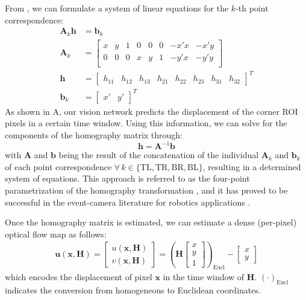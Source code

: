 From , we can formulate a system of linear equations for the $k$-th point correspondence:
\begin{align}
    \boldsymbol{A}_k \boldsymbol{h} &= \boldsymbol{b}_k \\
    \boldsymbol{A}_k &=  
    \begin{bmatrix}
    x & y & 1 & 0 & 0 & 0 & -x'x & -x'y \\
    0 & 0 & 0 & x & y & 1 & -y'x & -y'y\\
    \end{bmatrix}\label{eq:4}\\
    \boldsymbol{h} &= 
    \begin{bmatrix}
    h_{11} & h_{12} & h_{13} & h_{21} & h_{22} & h_{23} & h_{31} & h_{32}
    \end{bmatrix}^T\\
    \boldsymbol{b}_k &=
    \begin{bmatrix}
    x' & y'
    \end{bmatrix}^T\label{eq:6}
\end{align}
As shown in A, our vision network predicts the displacement of the corner ROI pixels in a certain time window. Using this information, we can solve for the components of the homography matrix through:
\begin{equation}
    \boldsymbol{h}=\boldsymbol{A}^{-1}\boldsymbol{b}
\end{equation}
with $\boldsymbol{A}$ and $\boldsymbol{b}$ being the result of the concatenation of the individual $\boldsymbol{A}_k$ and $\boldsymbol{b}_k$ of each point correspondence $\forall\, k\in\{\mathrm{TL},\mathrm{TR},\mathrm{BR},\mathrm{BL}\}$, resulting in a determined system of equations. This approach is referred to as the four-point parametrization of the homography transformation \cite{baker2006parameterizing}, and it has proved to be successful in the event-camera literature for robotics applications \cite{sanket2020evdodgenet, ozawa2022accuracy}.

Once the homography matrix is estimated, we can estimate a dense (per-pixel) optical flow map as follows:
\begin{align}\label{eq:sr_flow}
    \boldsymbol{u}(\boldsymbol{x}, \boldsymbol{H})=
    \begin{bmatrix}
    u(\boldsymbol{x}, \boldsymbol{H})\\
    v(\boldsymbol{x}, \boldsymbol{H})
    \end{bmatrix}
    =
    \left(\boldsymbol{H}
    \begin{bmatrix}
    x\\
    y\\
    1
    \end{bmatrix}
    \right)_\mathrm{Eucl}
    - 
    \begin{bmatrix}
    x\\
    y
    \end{bmatrix}
\end{align}
which encodes the displacement of pixel $\boldsymbol{x}$ in the time window of $\boldsymbol{H}$. $(\cdot)_\mathrm{Eucl}$ indicates the conversion from homogeneous to Euclidean coordinates.

